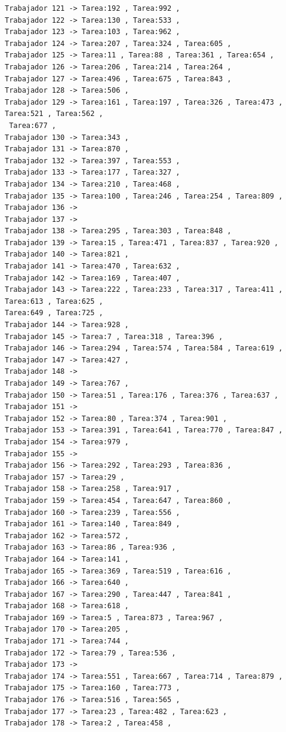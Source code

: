 \documentclass{article}
\begin{document}
\begin{lstlisting}
Trabajador 121 -> Tarea:192 , Tarea:992 , 
Trabajador 122 -> Tarea:130 , Tarea:533 , 
Trabajador 123 -> Tarea:103 , Tarea:962 , 
Trabajador 124 -> Tarea:207 , Tarea:324 , Tarea:605 , 
Trabajador 125 -> Tarea:11 , Tarea:88 , Tarea:361 , Tarea:654 , 
Trabajador 126 -> Tarea:206 , Tarea:214 , Tarea:264 , 
Trabajador 127 -> Tarea:496 , Tarea:675 , Tarea:843 , 
Trabajador 128 -> Tarea:506 , 
Trabajador 129 -> Tarea:161 , Tarea:197 , Tarea:326 , Tarea:473 , Tarea:521 , Tarea:562 ,
 Tarea:677 , 
Trabajador 130 -> Tarea:343 , 
Trabajador 131 -> Tarea:870 , 
Trabajador 132 -> Tarea:397 , Tarea:553 , 
Trabajador 133 -> Tarea:177 , Tarea:327 , 
Trabajador 134 -> Tarea:210 , Tarea:468 , 
Trabajador 135 -> Tarea:100 , Tarea:246 , Tarea:254 , Tarea:809 , 
Trabajador 136 -> 
Trabajador 137 -> 
Trabajador 138 -> Tarea:295 , Tarea:303 , Tarea:848 , 
Trabajador 139 -> Tarea:15 , Tarea:471 , Tarea:837 , Tarea:920 , 
Trabajador 140 -> Tarea:821 , 
Trabajador 141 -> Tarea:470 , Tarea:632 , 
Trabajador 142 -> Tarea:169 , Tarea:407 , 
Trabajador 143 -> Tarea:222 , Tarea:233 , Tarea:317 , Tarea:411 , Tarea:613 , Tarea:625 , 
Tarea:649 , Tarea:725 , 
Trabajador 144 -> Tarea:928 , 
Trabajador 145 -> Tarea:7 , Tarea:318 , Tarea:396 , 
Trabajador 146 -> Tarea:294 , Tarea:574 , Tarea:584 , Tarea:619 , 
Trabajador 147 -> Tarea:427 , 
Trabajador 148 -> 
Trabajador 149 -> Tarea:767 , 
Trabajador 150 -> Tarea:51 , Tarea:176 , Tarea:376 , Tarea:637 , 
Trabajador 151 -> 
Trabajador 152 -> Tarea:80 , Tarea:374 , Tarea:901 , 
Trabajador 153 -> Tarea:391 , Tarea:641 , Tarea:770 , Tarea:847 , 
Trabajador 154 -> Tarea:979 , 
Trabajador 155 -> 
Trabajador 156 -> Tarea:292 , Tarea:293 , Tarea:836 , 
Trabajador 157 -> Tarea:29 , 
Trabajador 158 -> Tarea:258 , Tarea:917 , 
Trabajador 159 -> Tarea:454 , Tarea:647 , Tarea:860 , 
Trabajador 160 -> Tarea:239 , Tarea:556 , 
Trabajador 161 -> Tarea:140 , Tarea:849 , 
Trabajador 162 -> Tarea:572 , 
Trabajador 163 -> Tarea:86 , Tarea:936 , 
Trabajador 164 -> Tarea:141 , 
Trabajador 165 -> Tarea:369 , Tarea:519 , Tarea:616 , 
Trabajador 166 -> Tarea:640 , 
Trabajador 167 -> Tarea:290 , Tarea:447 , Tarea:841 , 
Trabajador 168 -> Tarea:618 , 
Trabajador 169 -> Tarea:5 , Tarea:873 , Tarea:967 , 
Trabajador 170 -> Tarea:205 , 
Trabajador 171 -> Tarea:744 , 
Trabajador 172 -> Tarea:79 , Tarea:536 , 
Trabajador 173 -> 
Trabajador 174 -> Tarea:551 , Tarea:667 , Tarea:714 , Tarea:879 , 
Trabajador 175 -> Tarea:160 , Tarea:773 , 
Trabajador 176 -> Tarea:516 , Tarea:565 , 
Trabajador 177 -> Tarea:23 , Tarea:482 , Tarea:623 , 
Trabajador 178 -> Tarea:2 , Tarea:458 , 

\end{lstlisting}
\end{document}
